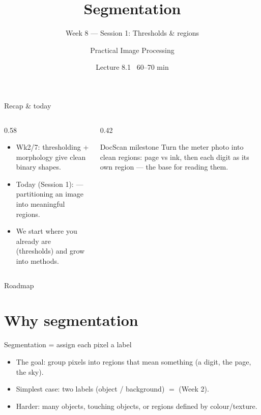 \documentclass[10pt,aspectratio=169]{beamer}
\title{Segmentation}
\subtitle{Week 8 — Session 1: Thresholds \& regions}
\author{Practical Image Processing}
\date{Lecture 8.1 \textbullet\ 60--70 min}
\begin{document}
\maketitle

\begin{frame}{Recap \& today}
  \begin{columns}[T]
    \begin{column}{0.58\textwidth}
      \begin{itemize}
        \item Wk2/7: thresholding + morphology give clean binary shapes.
        \item \alert{Today (Session 1):}  — partitioning an image
              into meaningful regions.
        \item We start where you already are (thresholds) and grow into
               methods.
      \end{itemize}
    \end{column}
    \begin{column}{0.42\textwidth}
      \begin{alertblock}{DocScan milestone}
        Turn the meter photo into clean regions: page vs ink, then each digit as its
        own region --- the base for reading them.
      \end{alertblock}
    \end{column}
  \end{columns}
\end{frame}

\begin{frame}{Roadmap}\tableofcontents\end{frame}

\section{Why segmentation}

\begin{frame}{Segmentation = assign each pixel a label}
  \begin{itemize}
    \item The goal: group pixels into regions that mean something (a digit, the page, the sky).
    \item Simplest case: two labels (object / background) $=$  (Week 2).
    \item Harder: many objects, touching objects, or regions defined by colour/texture.
  \end{itemize}
\end{frame}
\end{document}
